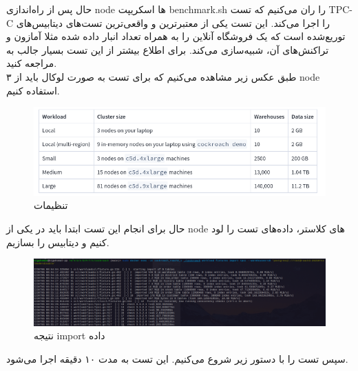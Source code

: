 حال پس از راه‌اندازی node ها اسکریپت benchmark.sh را ران می‌کنیم که 
تست TPC-C 
را اجرا می‌کند.
این تست یکی از معتبرترین و واقعی‌ترین تست‌های دیتابیس‌های توریع‌شده است که 
یک فروشگاه آنلاین را به همراه تعداد انبار داده شده مثلا آمازون و تراکنش‌های آن، شبیه‌سازی می‌کند.
برای اطلاع بیشتر از این تست بسیار جالب به 
مراجعه کنید.
\\
طبق عکس زیر مشاهده می‌کنیم که برای تست به صورت لوکال باید از ۳ 
node استفاده کنیم.
\\
\begin{figure}[H]
  \centering
  \includegraphics[scale=0.5]{pictures/cockroach/init/tpcc2.png}
  \caption{تنظیمات }
\end{figure}
حال برای انجام این تست ابتدا باید در یکی از node 
های کلاستر، داده‌های تست را لود کنیم و دیتابیس را بسازیم.
\\
\begin{figure}[H]
  \centering
  \includegraphics[scale=0.25]{pictures/cockroach/init/init-tpcc2.png}
  \caption{نتیجه import داده}
\end{figure}
سپس تست را با دستور زیر شروع می‌کنیم.
این تست به مدت ۱۰ دقیقه اجرا می‌شود.
